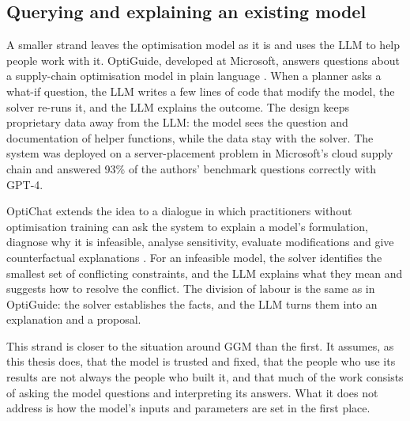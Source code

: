 \subsection{Querying and explaining an existing model}

A smaller strand leaves the optimisation model as it is and uses the LLM to help people work with it.
OptiGuide, developed at Microsoft, answers questions about a supply-chain optimisation model in plain language \citep{li2023large}.
When a planner asks a what-if question, the LLM writes a few lines of code that modify the model, the solver re-runs it, and the LLM explains the outcome.
The design keeps proprietary data away from the LLM: the model sees the question and documentation of helper functions, while the data stay with the solver.
The system was deployed on a server-placement problem in Microsoft's cloud supply chain and answered 93\% of the authors' benchmark questions correctly with GPT-4.

OptiChat extends the idea to a dialogue in which practitioners without optimisation training can ask the system to explain a model's formulation, diagnose why it is infeasible, analyse sensitivity, evaluate modifications and give counterfactual explanations \citep{chen2026optichat}.
For an infeasible model, the solver identifies the smallest set of conflicting constraints, and the LLM explains what they mean and suggests how to resolve the conflict.
The division of labour is the same as in OptiGuide: the solver establishes the facts, and the LLM turns them into an explanation and a proposal.

This strand is closer to the situation around GGM than the first.
It assumes, as this thesis does, that the model is trusted and fixed, that the people who use its results are not always the people who built it, and that much of the work consists of asking the model questions and interpreting its answers.
What it does not address is how the model's inputs and parameters are set in the first place.
